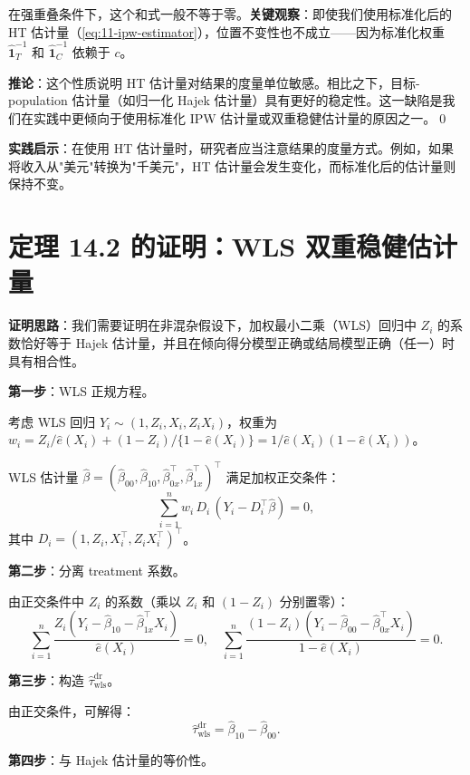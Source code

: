 在强重叠条件下，这个和式一般不等于零。\textbf{关键观察}：即使我们使用标准化后的 HT 估计量（\cref{eq:11-ipw-estimator}），位置不变性也不成立——因为标准化权重 $\hat{\mathbf{1}}_T^{-1}$ 和 $\hat{\mathbf{1}}_C^{-1}$ 依赖于 $c$。

\textbf{推论}：这个性质说明 HT 估计量对结果的度量单位敏感。相比之下，目标-population 估计量（如归一化 Hajek 估计量）具有更好的稳定性。这一缺陷是我们在实践中更倾向于使用标准化 IPW 估计量或双重稳健估计量的原因之一。\qed

\textbf{实践启示}：在使用 HT 估计量时，研究者应当注意结果的度量方式。例如，如果将收入从"美元"转换为"千美元"，HT 估计量会发生变化，而标准化后的估计量则保持不变。

\section{定理 14.2 的证明：WLS 双重稳健估计量}\label{sec:appendix-thm-14-2-proof}

\textbf{证明思路}：我们需要证明在非混杂假设下，加权最小二乘（WLS）回归中 $Z_i$ 的系数恰好等于 Hajek 估计量，并且在倾向得分模型正确或结局模型正确（任一）时具有相合性。

\textbf{第一步}：WLS 正规方程。

考虑 WLS 回归 $Y_i \sim (1, Z_i, X_i, Z_i X_i)$，权重为 $w_i = Z_i / \hat{e}(X_i) + (1-Z_i) / \{1-\hat{e}(X_i)\} = 1 / \hat{e}(X_i)(1-\hat{e}(X_i))$。

WLS 估计量 $\hat\beta = (\hat\beta_{00}, \hat\beta_{10}, \hat\beta_{0x}^\top, \hat\beta_{1x}^\top)^\top$ 满足加权正交条件：
\[
\sum_{i=1}^n w_i \, D_i \, (Y_i - D_i^\top \hat\beta) = 0,
\]
其中 $D_i = (1, Z_i, X_i^\top, Z_i X_i^\top)^\top$。

\textbf{第二步}：分离 treatment 系数。

由正交条件中 $Z_i$ 的系数（乘以 $Z_i$ 和 $(1-Z_i)$ 分别置零）：
\[
\sum_{i=1}^n \frac{Z_i(Y_i - \hat\beta_{10} - \hat\beta_{1x}^\top X_i)}{\hat{e}(X_i)} = 0,
\quad
\sum_{i=1}^n \frac{(1-Z_i)(Y_i - \hat\beta_{00} - \hat\beta_{0x}^\top X_i)}{1-\hat{e}(X_i)} = 0.
\]

\textbf{第三步}：构造 $\hat\tau_{\text{wls}}^{\text{dr}}$。

由正交条件，可解得：
\[
\hat\tau_{\text{wls}}^{\text{dr}} = \hat\beta_{10} - \hat\beta_{00}.
\]

\textbf{第四步}：与 Hajek 估计量的等价性。

